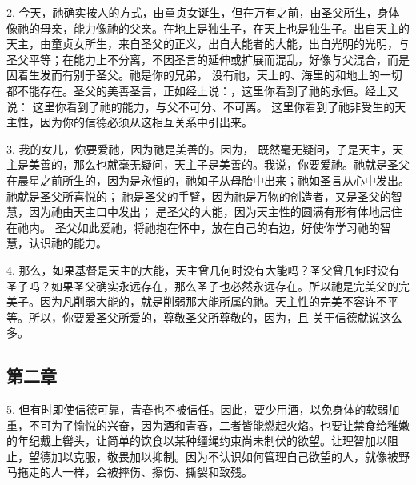 2. 今天，祂确实按人的方式，由童贞女诞生，但在万有之前，由圣父所生，身体像祂的母亲，能力像祂的父亲。在地上是独生子，在天上也是独生子。出自天主的天主，由童贞女所生，来自圣父的正义，出自大能者的大能，出自光明的光明，与圣父平等；在能力上不分离，不因圣言的延伸或扩展而混乱，好像与父混合，而是因着生发而有别于圣父。祂是你的兄弟， 没有祂，天上的、海里的和地上的一切都不能存在。圣父的美善圣言，正如经上说：，这里你看到了祂的永恒。经上又说： 这里你看到了祂的能力，与父不可分、不可离。 这里你看到了祂非受生的天主性，因为你的信德必须从这相互关系中引出来。\par

3. 我的女儿，你要爱祂，因为祂是美善的。因为， 既然毫无疑问，子是天主，天主是美善的，那么也就毫无疑问，天主子是美善的。我说，你要爱祂。祂就是圣父在晨星之前所生的，因为是永恒的，祂如子从母胎中出来；祂如圣言从心中发出。祂就是圣父所喜悦的； 祂是圣父的手臂，因为祂是万物的创造者，又是圣父的智慧，因为祂由天主口中发出； 是圣父的大能，因为天主性的圆满有形有体地居住在祂内。 圣父如此爱祂，将祂抱在怀中，放在自己的右边，好使你学习祂的智慧，认识祂的能力。\par

4. 那么，如果基督是天主的大能，天主曾几何时没有大能吗？圣父曾几何时没有圣子吗？如果圣父确实永远存在，那么圣子也必然永远存在。所以祂是完美父的完美子。因为凡削弱大能的，就是削弱那大能所属的祂。天主性的完美不容许不平等。所以，你要爱圣父所爱的，尊敬圣父所尊敬的，因为，且 关于信德就说这么多。\par


\subsection{第二章}

\par

5. 但有时即使信德可靠，青春也不被信任。因此，要少用酒，以免身体的软弱加重，不可为了愉悦的兴奋，因为酒和青春，二者皆能燃起火焰。也要让禁食给稚嫩的年纪戴上辔头，让简单的饮食以某种缰绳约束尚未制伏的欲望。让理智加以阻止，望德加以克服，敬畏加以抑制。因为不认识如何管理自己欲望的人，就像被野马拖走的人一样，会被摔伤、擦伤、撕裂和致残。\par


